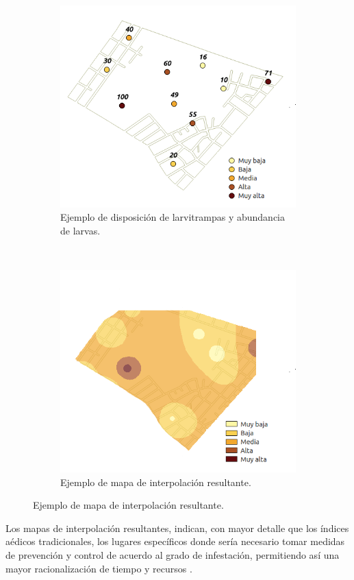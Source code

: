 \begin{figure}[!htbp]
    \centering
    \begin{subfigure}[b]{0.45\textwidth}
        \includegraphics[width=1\textwidth]{capitulo-2/graphics/distribucion-puntos-control.png}
        \caption{\label{fig:sig-distribucion-puntos-control}Ejemplo de disposición de larvitrampas y abundancia de larvas.}
    \end{subfigure}
    ~~~~
    \begin{subfigure}[b]{0.45\textwidth}
        \includegraphics[width=1\textwidth]{capitulo-2/graphics/puntos-control-interpolacion.png}
        \caption{\label{fig:sig-puntos-control-interpolacion} Ejemplo de mapa de interpolación resultante.}
    \end{subfigure}
\end{figure}

Los mapas de interpolación resultantes, indican, con mayor detalle que los índices aédicos
tradicionales, los lugares específicos donde sería necesario tomar medidas de prevención y
control de acuerdo al grado de infestación, permitiendo así una mayor racionalización de tiempo y
recursos \cite{NINO2011}.
